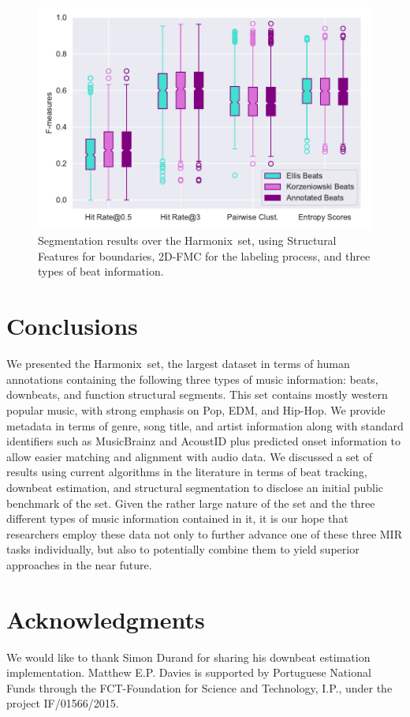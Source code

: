 \documentclass{article}
\newcommand{\setName}{Harmonix}
\begin{document}
\begin{figure}
    \centerline{\includegraphics[width=1.1\columnwidth]{figs/segment_results.pdf}}
    \caption{Segmentation results over the \setName~set, using Structural Features for boundaries, 2D-FMC for the labeling process, and three types of beat information.}
    \label{fig:segment_results}
\end{figure}

\section{Conclusions}\label{sec:conclusions}

We presented the \setName~set, the largest dataset in terms of human annotations containing the following three types of music information: beats, downbeats, and function structural segments.
This set contains mostly western popular music, with strong emphasis on Pop, EDM, and Hip-Hop.
We provide metadata in terms of genre, song title, and artist information along with standard identifiers such as MusicBrainz and AcoustID plus predicted onset information to allow easier matching and alignment with audio data.
We discussed a set of results using current algorithms in the literature in terms of beat tracking, downbeat estimation, and structural segmentation to disclose an initial public benchmark of the set.
Given the rather large nature of the set and the three different types of music information contained in it, it is our hope that researchers employ these data not only to further advance one of these three MIR tasks individually, but also to potentially combine them to yield superior approaches in the near future.

\section{Acknowledgments}

We would like to thank Simon Durand for sharing his downbeat estimation implementation.
Matthew E.P. Davies is supported by Portuguese National Funds through the FCT-Foundation for Science and Technology, I.P., under the project IF/01566/2015.

\balance

\end{document}
